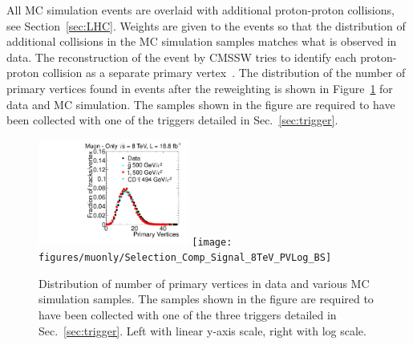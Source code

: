 All MC simulation events are overlaid with additional proton-proton collisions, see Section~\ref{sec:LHC}.
Weights are given to the events so that the distribution of additional collisions in the MC simulation samples matches what is observed in data.
The reconstruction of the event by CMSSW tries to identify each proton-proton collision as a separate primary vertex~\cite{2010EPJC...70.1165K}.
The distribution of the number of primary vertices found in events after the reweighting is shown in Figure~\ref{fig:PV} for data and MC simulation.
The samples shown in the figure are required to have been collected with one of the triggers detailed in Sec.~\ref{sec:trigger}.

\begin{figure}
  \begin{center}
      \includegraphics[clip=false, trim=0.0cm 0cm 0.0cm 0cm, width=0.44\textwidth]{figures/muonly/Selection_Comp_Signal_8TeV_PV_BS}
      \texttt{[image: figures/muonly/Selection\_Comp\_Signal\_8TeV\_PVLog\_BS]} \\
  \end{center}
        \caption[Distribution of number of primary vertices in data and various MC simulation samples]
{Distribution of number of primary vertices in data and various MC simulation samples. 
The samples shown in the figure are required to have been collected with one of the three triggers detailed in Sec.~\ref{sec:trigger}.
Left with linear y-axis scale, right with log scale.
        }
      \label{fig:PV}
\end{figure}